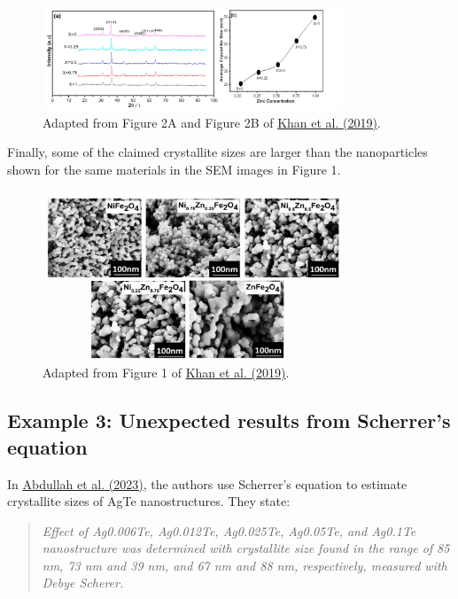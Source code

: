 \documentclass[letterpaper, 12pt]{article}
\begin{document}
\begin{figure}[h!tbp]
    \includegraphics[width=0.8\textwidth]{img/xrd/xrd_publication_mockup_khan.jpg}
    \caption*{ Adapted from Figure 2A and Figure 2B of \href{https://doi.org/10.3390/nano9071024}{Khan et al. (2019)}.}
\end{figure}

Finally, some of the claimed crystallite sizes are larger than the nanoparticles shown for the same materials in the SEM images in Figure 1. 

\begin{figure}[h!tbp]
\centering
    \includegraphics[width=0.8\textwidth]{img/xrd/xrd_sem_images_khan.jpg}
    \caption*{ Adapted from Figure 1 of \href{https://doi.org/10.3390/nano9071024}{Khan et al. (2019)}.}
\end{figure}

\subsection*{Example 3: Unexpected results from Scherrer's equation}

In \href{https://doi.org/10.1021/acs.energyfuels.2c03279}{Abdullah et al. (2023)}, the authors use Scherrer's equation to estimate crystallite sizes of AgTe nanostructures. They state:

\begin{quote}
    \textit{Effect of Ag0.006Te, Ag0.012Te, Ag0.025Te, Ag0.05Te, and Ag0.1Te nanostructure was determined with crystallite size found in the range of 85 nm, 73 nm and 39 nm, and 67 nm and 88 nm, respectively, measured with Debye Scherer.}
\end{quote}
\end{document}
